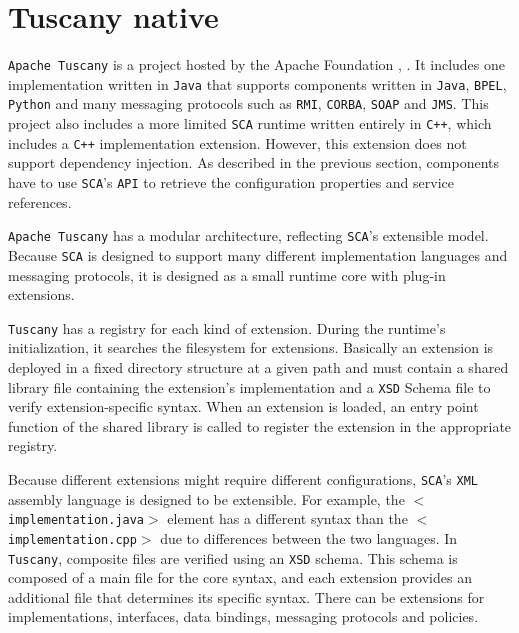 \section{Tuscany native}

\texttt{Apache Tuscany} is a project hosted by the Apache Foundation \cite{Tuscany}, \cite{Laws}. It includes one implementation written
in \texttt{Java} that supports components written in \texttt{Java}, \texttt{BPEL}, \texttt{Python} and many messaging protocols such as \texttt{RMI}, \texttt{CORBA}, \texttt{SOAP} and \texttt{JMS}.
This project also includes a more limited \texttt{SCA} runtime written entirely in \texttt{C++}, which includes a \texttt{C++} implementation extension.
However, this extension does not support dependency injection. As described in the previous section, components have to use
\texttt{SCA}'s \texttt{API} to retrieve the configuration properties and service references.

\texttt{Apache Tuscany} has a modular architecture, reflecting \texttt{SCA}'s extensible model. Because \texttt{SCA} is designed to support many
different implementation languages and messaging protocols, it is designed as a small runtime core with plug-in extensions.

\texttt{Tuscany} has a registry for each kind of extension. During the runtime's initialization, it searches the filesystem for
extensions. Basically an extension is deployed in a fixed directory structure at a given path and must contain a shared
library file containing the extension's implementation and a \texttt{XSD} Schema file to verify extension-specific syntax.
When an extension is loaded, an entry point function of the shared library is called to register the extension in
the appropriate registry.

Because different extensions might require different configurations, \texttt{SCA}'s \texttt{XML} assembly language is designed to be extensible.
For example, the \texttt{$<$implementation.java$>$} element has a different syntax than the \texttt{$<$implementation.cpp$>$}
due to differences between the two languages. In \texttt{Tuscany}, composite files are verified using an \texttt{XSD} schema. This schema is
composed of a main file for the core syntax, and each extension provides an additional file that determines its specific syntax.
There can be extensions for implementations, interfaces, data bindings, messaging protocols and policies.



